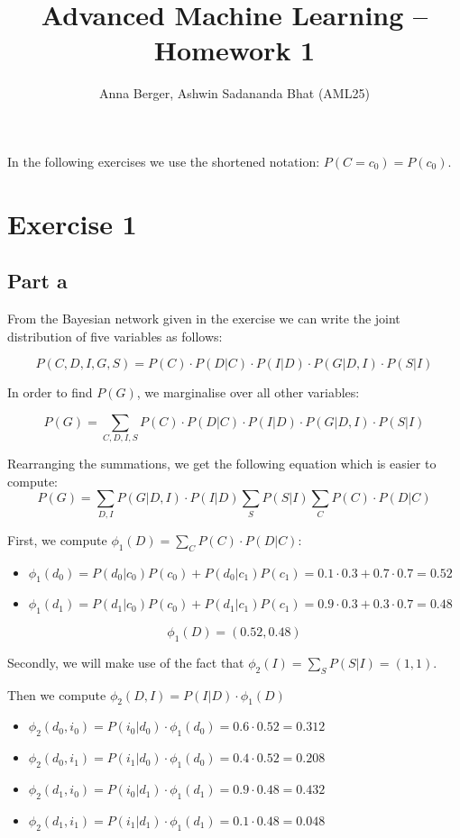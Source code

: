 \documentclass[11pt,a4paper]{article}
\title{\textbf{Advanced Machine Learning -- Homework 1}}
\author{Anna Berger, Ashwin Sadananda Bhat (AML25)}
\begin{document}
	\maketitle
	
	In the following exercises we use the shortened notation: $ P(C = c_0) = P(c_0).$
	\section*{Exercise 1}
	
	
	\subsection*{Part a}
	
	From the Bayesian network given in the exercise we can write the joint distribution of five variables as follows:
	
	$$ P(C,D,I,G,S) = P(C) \cdot  P(D|C)\cdot  P(I|D) \cdot  P(G|D,I) \cdot  P(S|I) $$ 
	
	In order to find $P(G)$, we marginalise over all other variables:
	
	$$ P(G) = \sum_{C, D, I, S} P(C) \cdot  P(D|C)\cdot P(I|D)\cdot P(G|D,I)\cdot P(S|I) $$ 
	
	Rearranging the summations, we get the following equation which is easier to compute:
	$$ P(G) = \sum_{D, I} P(G|D,I)\cdot P(I|D) \sum_{S} P(S | I)  \sum_{C} P(C) \cdot  P(D|C) $$ 
	
	First, we compute $ \phi_1(D) =  \sum_{C} P(C) \cdot  P(D|C): $

	\begin{itemize}
		\item $ \phi_1(d_0) = P(d_0 | c_0) P(c_0) + P(d_0 | c_1) P(c_1) = 0.1 \cdot 0.3 + 0.7 \cdot 0.7 = 0.52 $
		\item $ \phi_1(d_1) = P(d_1 | c_0) P(c_0) + P(d_1 | c_1) P(c_1) = 0.9 \cdot 0.3 + 0.3 \cdot 0.7 = 0.48 $
	\end{itemize} 
	
	$$ \phi_1(D)  = (0.52, 0.48)$$
	
	Secondly, we will make use of the fact that  $\phi_2(I) = \sum_{S} P(S | I) = (1, 1). $
	
	Then we compute $\phi_2(D, I) = P(I|D) \cdot \phi_1(D)$
	
	\begin{itemize}
		\item $\phi_2(d_0, i_0) = P(i_0 | d_0) \cdot \phi_1(d_0) = 0.6 \cdot 0.52 = 0.312 $
		\item $\phi_2(d_0, i_1) = P(i_1 | d_0) \cdot \phi_1(d_0) = 0.4 \cdot 0.52 = 0.208 $
		\item $\phi_2(d_1, i_0) = P(i_0 | d_1) \cdot \phi_1(d_1) = 0.9 \cdot 0.48 = 0.432 $
		\item $\phi_2(d_1, i_1) = P(i_1 | d_1) \cdot \phi_1(d_1) = 0.1 \cdot 0.48 = 0.048 $
	\end{itemize}
	
\end{document}
